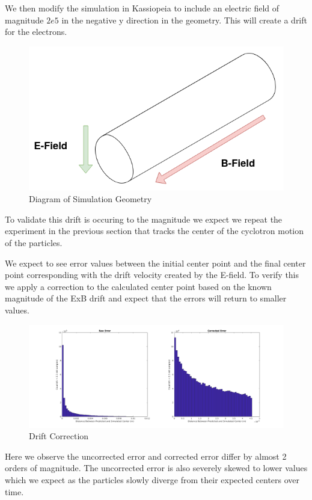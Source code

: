 \documentclass[12pt,letterpaper]{article}
\begin{document}
We then modify the simulation in Kassiopeia to include an electric field of magnitude $2e5$ in the negative y direction in the geometry. This will create a drift for the electrons.

    \begin{figure}[H]
    \centering
    \includegraphics[width=0.8\linewidth]{img/CRES.png}
    \caption{Diagram of Simulation Geometry}
    \end{figure}

To validate this drift is occuring to the magnitude we expect we repeat the experiment in the previous section that tracks the center of the cyclotron motion of the particles. 

We expect to see error values between the initial center point and the final center point corresponding with the drift velocity created by the E-field. To verify this we apply a correction to the calculated center point based on the known magnitude of the ExB drift and expect that the errors will return to smaller values.

    \begin{figure}[H]
    \centering
    \includegraphics[width=0.9\linewidth]{img/drift.png}
    \caption{Drift Correction}
    \end{figure}

Here we observe the uncorrected error and corrected error differ by almost 2 orders of magnitude. The uncorrected error is also severely skewed to lower values which we expect as the particles slowly diverge from their expected centers over time. 
\end{document}
